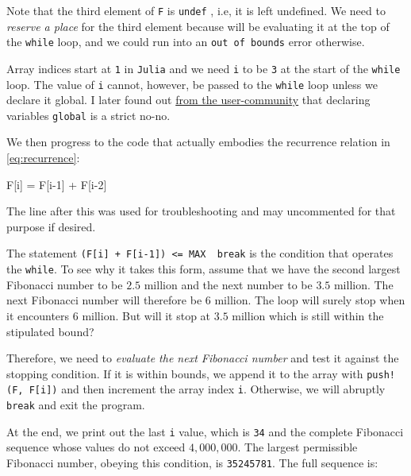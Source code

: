 \documentclass[
  a4paper,
]{article}
\newenvironment{Shaded}{\begin{snugshade}}{\end{snugshade}}
\newcommand{\FloatTok}[1]{\textcolor[rgb]{0.75,0.75,0.82}{#1}}
\newcommand{\NormalTok}[1]{\textcolor[rgb]{0.80,0.80,0.80}{#1}}
\newcommand{\OperatorTok}[1]{\textcolor[rgb]{0.94,0.94,0.82}{#1}}
\begin{document}
Note that the third element of \texttt{F} is \texttt{undef} , i.e, it is
left undefined. We need to \emph{reserve a place} for the third element
because will be evaluating it at the top of the \texttt{while} loop, and
we could run into an \texttt{out\ of\ bounds} error otherwise.

Array indices start at \texttt{1} in \texttt{Julia} and we need
\texttt{i} to be \texttt{3} at the start of the \texttt{while} loop. The
value of \texttt{i} cannot, however, be passed to the \texttt{while}
loop unless we declare it global. I later found out
\href{https://discourse.julialang.org/t/help-with-project-euler-2-undef-inits-printing-multiplication-by-juxtaposition-and-more/106930}{from
the user-community} that declaring variables \texttt{global} is a strict
no-no.

We then progress to the code that actually embodies the recurrence
relation in \cref{eq:recurrence}:

\begin{Shaded}
\begin{Highlighting}[]
\NormalTok{F[i] }\OperatorTok{=}\NormalTok{ F[i}\OperatorTok{{-}}\FloatTok{1}\NormalTok{] }\OperatorTok{+}\NormalTok{ F[i}\OperatorTok{{-}}\FloatTok{2}\NormalTok{]}
\end{Highlighting}
\end{Shaded}

The line after this was used for troubleshooting and may uncommented for
that purpose if desired.

The statement
\texttt{(F{[}i{]}\ +\ F{[}i-1{]})\ \textless{}=\ MAX\ \textbar{}\textbar{}\ break}
is the condition that operates the \texttt{while}. To see why it takes
this form, assume that we have the second largest Fibonacci number to be
\(2.5\) million and the next number to be \(3.5\) million. The next
Fibonacci number will therefore be \(6\) million. The loop will surely
stop when it encounters \(6\) million. But will it stop at \(3.5\)
million which is still within the stipulated bound?

Therefore, we need to \emph{evaluate the next Fibonacci number} and test
it against the stopping condition. If it is within bounds, we append it
to the array with \texttt{push!(F,\ F{[}i{]})} and then increment the
array index \texttt{i}. Otherwise, we will abruptly \texttt{break} and
exit the program.

At the end, we print out the last \texttt{i} value, which is \texttt{34}
and the complete Fibonacci sequence whose values do not exceed
\(4,000,000\). The largest permissible Fibonacci number, obeying this
condition, is \texttt{35245781}. The full sequence is:
\end{document}
